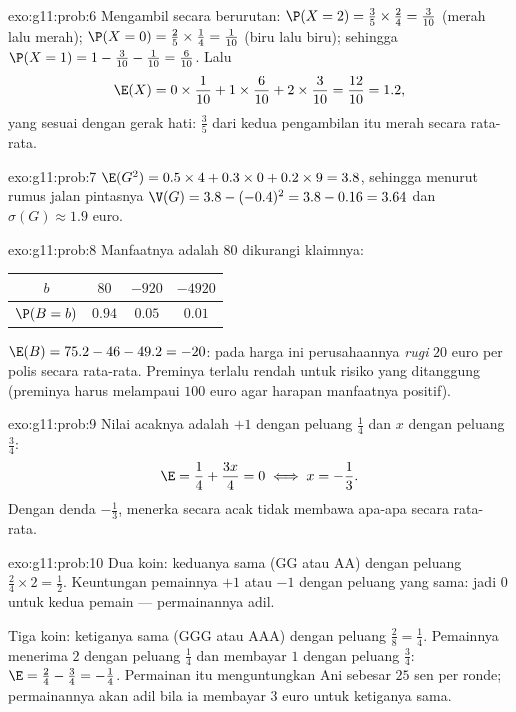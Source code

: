 \begin{solution}{exo:g11:prob:6}
Mengambil secara berurutan: $\P(X = 2) = \frac35 \times \frac24 = \frac{3}{10}$
(merah lalu merah); $\P(X = 0) = \frac25 \times \frac14 = \frac{1}{10}$
(biru lalu biru); sehingga
$\P(X = 1) = 1 - \frac{3}{10} - \frac{1}{10} = \frac{6}{10}$. Lalu
\[
\E(X) = 0 \times \frac1{10} + 1 \times \frac6{10} + 2 \times \frac3{10}
= \frac{12}{10} = 1.2 ,
\]
yang sesuai dengan gerak hati: $\frac35$ dari kedua pengambilan itu merah secara rata-rata.
\end{solution}

\begin{solution}{exo:g11:prob:7}
$\E(G^2) = 0.5 \times 4 + 0.3 \times 0 + 0.2 \times 9 = 3.8$, sehingga menurut
rumus jalan pintasnya
$\V(G) = 3.8 - (-0.4)^2 = 3.8 - 0.16 = 3.64$ dan
$\sigma(G) \approx 1.9$ euro.
\end{solution}

\begin{solution}{exo:g11:prob:8}
Manfaatnya adalah $80$ dikurangi klaimnya:
\begin{center}
\begin{tabular}{c|ccc}
$b$ & $80$ & $-920$ & $-4920$\\
\hline
$\P(B=b)$ & $0.94$ & $0.05$ & $0.01$
\end{tabular}
\end{center}
$\E(B) = 75.2 - 46 - 49.2 = -20$: pada harga ini perusahaannya \emph{rugi}
$20$ euro per polis secara rata-rata. Preminya terlalu rendah untuk risiko yang
ditanggung (preminya harus melampaui $100$ euro agar harapan manfaatnya
positif).
\end{solution}

\begin{solution}{exo:g11:prob:9}
Nilai acaknya adalah $+1$ dengan peluang $\frac14$ dan $x$ dengan
peluang $\frac34$:
\[
\E = \frac14 + \frac{3x}{4} = 0 \iff x = -\frac13 .
\]
Dengan denda $-\frac13$, menerka secara acak tidak membawa apa-apa secara rata-rata.
\end{solution}

\begin{solution}{exo:g11:prob:10}
Dua koin: keduanya sama (GG atau AA) dengan peluang $\frac24 \times 2 =
\frac12$. Keuntungan pemainnya $+1$ atau $-1$ dengan peluang yang sama:
jadi  $0$ untuk kedua pemain --- permainannya adil.

Tiga koin: ketiganya sama (GGG atau AAA) dengan peluang $\frac{2}{8} =
\frac14$. Pemainnya menerima $2$ dengan peluang $\frac14$ dan membayar $1$
dengan peluang $\frac34$:
$\E = \frac24 - \frac34 = -\frac14$. Permainan itu menguntungkan Ani sebesar
$25$ sen per ronde; permainannya akan adil bila ia membayar $3$ euro untuk
ketiganya sama.
\end{solution}

